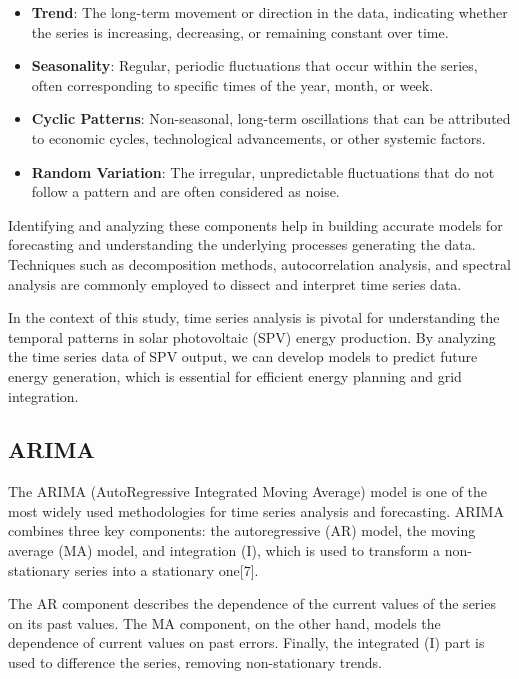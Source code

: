 \documentclass[a4paper,12pt]{article}
\begin{document}
\begin{itemize}
    \item \textbf{Trend}: The long-term movement or direction in the data, indicating whether the series is increasing, decreasing, or remaining constant over time.
    \item \textbf{Seasonality}: Regular, periodic fluctuations that occur within the series, often corresponding to specific times of the year, month, or week.
    \item \textbf{Cyclic Patterns}: Non-seasonal, long-term oscillations that can be attributed to economic cycles, technological advancements, or other systemic factors.
    \item \textbf{Random Variation}: The irregular, unpredictable fluctuations that do not follow a pattern and are often considered as noise.
\end{itemize}

Identifying and analyzing these components help in building accurate models for forecasting and understanding the underlying processes generating the data. Techniques such as decomposition methods, autocorrelation analysis, and spectral analysis are commonly employed to dissect and interpret time series data.

In the context of this study, time series analysis is pivotal for understanding the temporal patterns in solar photovoltaic (SPV) energy production. By analyzing the time series data of SPV output, we can develop models to predict future energy generation, which is essential for efficient energy planning and grid integration.

\subsection{ARIMA}

The ARIMA (AutoRegressive Integrated Moving Average) model is one of the most widely used methodologies for time series analysis and forecasting. ARIMA combines three key components: the autoregressive (AR) model, the moving average (MA) model, and integration (I), which is used to transform a non-stationary series into a stationary one[7].

The AR component describes the dependence of the current values of the series on its past values. The MA component, on the other hand, models the dependence of current values on past errors. Finally, the integrated (I) part is used to difference the series, removing non-stationary trends.
\end{document}
